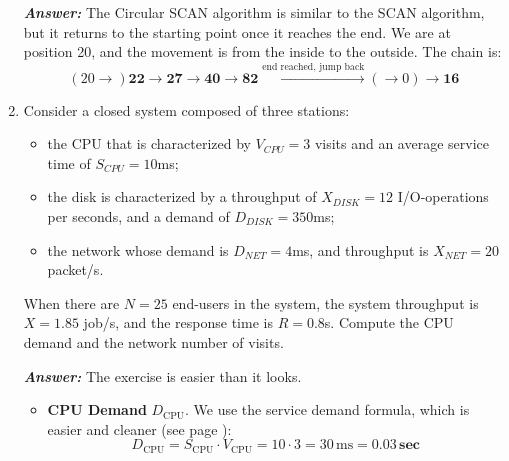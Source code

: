 \begin{enumerate}
    \textcolor{Green3}{\textbf{\emph{Answer:}}} The Circular SCAN algorithm is similar to the SCAN algorithm, but it returns to the starting point once it reaches the end. We are at position 20, and the movement is from the inside to the outside. The chain is:
    \begin{equation*}
        \left(20 \to\right) \mathbf{22} \to \mathbf{27} \to \mathbf{40} \to \mathbf{82} \xrightarrow{\text{end reached, jump back}} \left(\to 0\right) \to \mathbf{16}
    \end{equation*}


    \newpage


    \item Consider a closed system composed of three stations:
    \begin{itemize}
        \item the CPU that is characterized by $V_{CPU} = 3$ visits and an average service time of $S_{CPU} = 10$ms;
        \item the disk is characterized by a throughput of $X_{DISK} = 12$ I/O-operations per seconds, and a demand of $D_{DISK} = 350$ms;
        \item the network whose demand is $D_{NET} = 4$ms, and throughput is $X_{NET} = 20$ packet/s.
    \end{itemize}
    When there are $N = 25$ end-users in the system, the system throughput is $X = 1.85$ job/s, and the response time is $R = 0.8$s. Compute the CPU demand and the network number of visits.

    \textcolor{Green3}{\textbf{\emph{Answer:}}} The exercise is easier than it looks.
    \begin{itemize}
        \item \textbf{CPU Demand} $D_{\text{CPU}}$. We use the service demand formula, which is easier and cleaner (see page \pageref{eq: Service Demand}):
        \begin{equation*}
            D_{\text{CPU}} = S_{\text{CPU}} \cdot V_{\text{CPU}} = 10 \cdot 3 = 30 \, \text{ms} = \mathbf{0.03} \, \textbf{sec}
        \end{equation*}
        

\end{itemize}
\end{enumerate}
